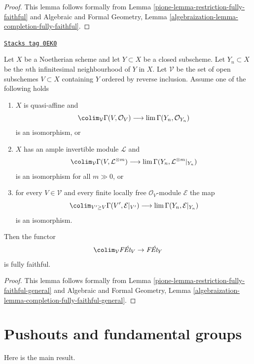 \begin{proof}

This lemma follows formally from
Lemma \ref{pione-lemma-restriction-fully-faithful} and
Algebraic and Formal Geometry, Lemma
\ref{algebraization-lemma-completion-fully-faithful}.
\end{proof}

\begin{lemma}
\label{pione-lemma-restriction-fully-faithful-general-special}
\href{https://stacks.math.columbia.edu/tag/0EK0}{\texttt{Stacks tag 0EK0}}

Let $X$ be a Noetherian scheme and let $Y \subset X$ be a closed subscheme.
Let $Y_n \subset X$ be the $n$th infinitesimal neighbourhood of $Y$ in $X$.
Let $\mathcal{V}$ be the set of open subschemes $V \subset X$ containing $Y$
ordered by reverse inclusion. Assume one of the following holds
\begin{enumerate}
\item $X$ is quasi-affine and
$$
\colim_\mathcal{V} \Gamma(V, \mathcal{O}_V)
\longrightarrow
\lim \Gamma(Y_n, \mathcal{O}_{Y_n})
$$
is an isomorphism, or
\item $X$ has an ample invertible module $\mathcal{L}$ and
$$
\colim_\mathcal{V} \Gamma(V, \mathcal{L}^{\otimes m})
\longrightarrow
\lim \Gamma(Y_n, \mathcal{L}^{\otimes m}|_{Y_n})
$$
is an isomorphism for all $m \gg 0$, or
\item for every $V \in \mathcal{V}$ and every finite locally free
$\mathcal{O}_V$-module $\mathcal{E}$ the map
$$
\colim_{V' \geq V} \Gamma(V', \mathcal{E}|_{V'})
\longrightarrow
\lim \Gamma(Y_n, \mathcal{E}|_{Y_n})
$$
is an isomorphism.
\end{enumerate}
Then the functor
$$
\colim_\mathcal{V} \textit{F\'Et}_V \to \textit{F\'Et}_Y
$$
is fully faithful.
\end{lemma}

\begin{proof}

This lemma follows formally from
Lemma \ref{pione-lemma-restriction-fully-faithful-general} and
Algebraic and Formal Geometry, Lemma
\ref{algebraization-lemma-completion-fully-faithful-general}.
\end{proof}

\section{Pushouts and fundamental groups}
\label{pione-section-pushouts}
Here is the main result.

